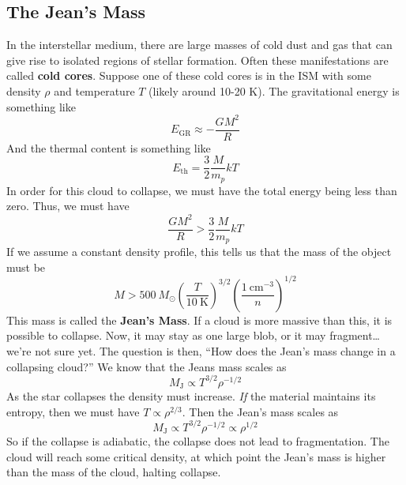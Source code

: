 \documentclass[10pt]{article}
\numberwithin{equation}{section}
\begin{document}
\subsection{The Jean's Mass}

  In the interstellar medium, there are large masses of cold dust and
  gas that can give rise to isolated regions of stellar formation. Often
  these manifestations are called \textbf{cold cores}. Suppose one of
  these cold cores is in the ISM with some density $\rho$ and
  temperature $T$ (likely around 10-20 K). The gravitational energy is
  something like
  \begin{equation}
    \label{eq:59}
    E_{\mathrm{GR}}\approx -\frac{GM^2}{R}
  \end{equation}
  And the thermal content is something like
  \begin{equation}
    \label{eq:60}
    E_{\mathrm{th}}=\frac{3}{2}\frac{M}{m_p}kT
  \end{equation}
  In order for this cloud to collapse, we must have the total energy
  being less than zero. Thus, we must have
  \begin{equation}
    \label{eq:61}
    \frac{GM^2}{R}>\frac{3}{2}\frac{M}{m_p}kT
  \end{equation}
  If we assume a constant density profile, this tells us that the mass
  of the object must be
  \begin{equation}
    \label{eq:62}
    M>500\ M_\odot\left(\frac{T}{10\
        \mathrm{K}}\right)^{3/2}\left(\frac{1\ \mathrm{cm}^{-3}}{n}\right)^
{1/2}
  \end{equation}
  This mass is called the \textbf{Jean's Mass}. If a cloud is more
  massive than this, it is possible to collapse. Now, it may stay as
  one large blob, or it may fragment\ldots we're not sure yet. The
  question is then, ``How does the Jean's mass change in a collapsing
  cloud?'' We know that the Jeans mass scales as
  \begin{equation}
    \label{eq:63}
    M_\mathrm{J}\propto T^{3/2}\rho^{-1/2}
  \end{equation}
  As the star collapses the density must increase. \emph{If} the
  material maintains its entropy, then we must have $T\propto
  \rho^{2/3}$. Then the Jean's mass scales as
  \begin{equation}
    \label{eq:64}
    M_{\mathrm{J}}\propto T^{3/2}\rho^{-1/2}\propto\rho^{1/2}
  \end{equation}
  So if the collapse is adiabatic, the collapse does not lead to
  fragmentation. The cloud will reach some critical density, at which
  point the Jean's mass is higher than the mass of the cloud, halting
  collapse.\\
\end{document}
